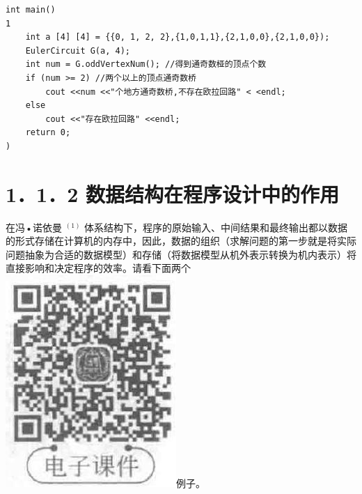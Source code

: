 \documentclass[10pt]{article}
\begin{document}
\begin{verbatim}
int main()
1
    int a [4] [4] = {{0, 1, 2, 2},{1,0,1,1},{2,1,0,0},{2,1,0,0});
    EulerCircuit G(a, 4);
    int num = G.oddVertexNum(); //得到通奇数桠的顶点个数
    if (num >= 2) //两个以上的顶点通奇数桥
        cout <<num <<"个地方通奇数桥,不存在欧拉回路" < <endl;
    else
        cout <<"存在欧拉回路" <<endl;
    return 0;
)
\end{verbatim}

\section*{1．1．2 数据结构在程序设计中的作用}
在冯•诺依曼 ${ }^{(1)}$ 体系结构下，程序的原始输入、中间结果和最终输出都以数据的形式存储在计算机的内存中，因此，数据的组织（求解问题的第一步就是将实际问题抽象为合适的数据模型）和存储（将数据模型从机外表示转换为机内表示）将直接影响和决定程序的效率。请看下面两个\\
\includegraphics[max width=\textwidth]{2025_06_06_704745ea57b15b2333e5g-018}例子。
\end{document}

